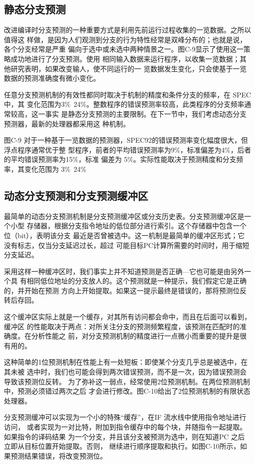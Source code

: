\subsection{静态分支预测}
改进编译时分支预测的一种重要方式是利用先前运行过程收集的一览数据。之所以值得这
样做，是因为人们观测到分支的行为特性经常是双峰分布的；也就是说，各个分支经常是严重
偏向于选中或未选中两种情景之一。图C-9显示了使用这一策略成功地进行了分支预测。使用
相同输入数据来运行程序，以收集一览数据；其他研究表明，如果改变输人，使不同运行的一
览数据发生变化，只会使基于一览数据的预测准确度有微小变化。

任意分支预测机制的有效性都同时取决于机制的精度和条件分支的频率，在 SPEC中，其
变化范围为3\%~24\%。整数程序的错误预测率较高，此类程序的分支频率通常较高，这一事实
是静态分支预测的主要限制。在下一节中，我们考虑动态分支预测器，最新的处理器都采用这
种机制。

图C-9 对于一种基于一览数据的预测器，SPEC92的错误预测率变化幅度很大，但浮点程序通常优于整
型程序，前者的平均错误预测率为9\%，标准偏差为4\%，后者的平均错误预测率为15\%，标准
偏差为 5\%。实际性能取决于预测精度和分支频率，其变化范围为 3\%~24\%

\subsection{动态分支预测和分支预测缓冲区}
最简单的动态分支预测机制是分支预测缓冲区或分支历史表。分支预测缓冲区是一个小型
存储器，根据分支指令地址的低位部分进行索引。这个存储器中包含一个位（bit），表明该分支
最近是否曾被选中。这一机制是最简单的缓冲区形式；它没有标志，仅当分支延迟过长，超过
可能目标PC计算所需要的时间时，用于缩短分支延迟。

采用这样一种缓冲区时，我们事实上并不知道预测是否正确—它也可能是由另外一个具
有相同低位地址的分支放人的。这个预测就是一种提示，我们假定它是正确的，并开始在预测
方向上开始提取。如果这一提示最终是错误的，那将预测位反转后存回。

这个缓冲区实际上就是一个缓存，对其所有访问都会命中，而且在后面可以看到，缓冲区
的性能取决于两点：对所关注分支的预测频繁程度，该预测在匹配时的准确度。在分析性能之
前，对分支预测机制的精度进行一点微小而重要的提升是很有用的。

这种简单的1位预测机制在性能上有一处短板：即使某个分支几乎总是被选中，在其未被
选中时，我们也可能会得到两次错误预测，而不是一次，因为错误预测会导致该预测位反转。
为了弥补这一弱点，经常使用2位预测机制。在两位预测机制中，预测必须错过两次之后
才会进行修改。图C-10给出了2位预测机制的有限状态处理器。

分支预测缓冲可以实现为一个小的特殊“缓存”，在IF 流水线中使用指令地址进行访问，
或者实现为一对比特，附加到指令缓存中的每个块，并随指令一起提取。如果指令的译码结果
为一个分支，并且该分支被预测为选中，则在知道PC 之后立即从目标位置开始提取。否则，
继续进行顺序提取和执行。如图C-10所示，如果预测结果错误，将改变预测位。

